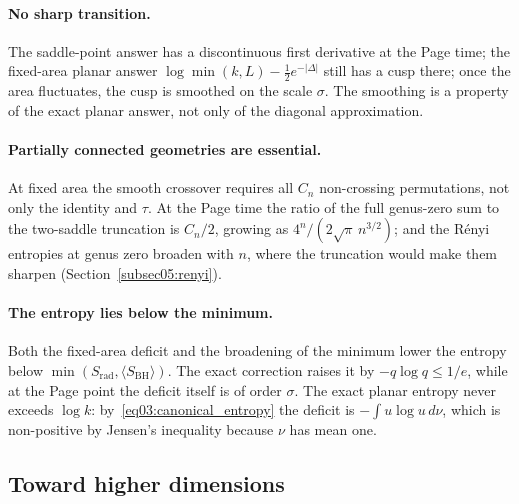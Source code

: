 \documentclass[11pt,letterpaper]{article}
\theoremstyle{plain}
\theoremstyle{definition}
\theoremstyle{remark}
\begin{document}
\paragraph{No sharp transition.} The saddle-point answer has a discontinuous first derivative at the Page time; the fixed-area planar answer $\log\min(k,L) - \tfrac12 e^{-|\Delta|}$ still has a cusp there; once the area fluctuates, the cusp is smoothed on the scale $\sigma$. The smoothing is a property of the exact planar answer, not only of the diagonal approximation.

\paragraph{Partially connected geometries are essential.} At fixed area the smooth crossover requires all $C_n$ non-crossing permutations, not only the identity and $\tau$. At the Page time the ratio of the full genus-zero sum to the two-saddle truncation is $C_n/2$, growing as $4^n/(2\sqrt{\pi}\,n^{3/2})$; and the R\'enyi entropies at genus zero broaden with $n$, where the truncation would make them sharpen (Section~\ref{subsec05:renyi}).

\paragraph{The entropy lies below the minimum.} Both the fixed-area deficit and the broadening of the minimum lower the entropy below $\min(S_{\mathrm{rad}}, \langle S_{\mathrm{BH}}\rangle)$. The exact correction raises it by $-q\log q \le 1/e$, while at the Page point the deficit itself is of order $\sigma$. The exact planar entropy never exceeds $\log k$: by~\eqref{eq03:canonical_entropy} the deficit is $-\int u\log u\, d\nu$, which is non-positive by Jensen's inequality because $\nu$ has mean one.

\subsection{Toward higher dimensions}
\label{subsec06:higher_dimensions}
\end{document}

